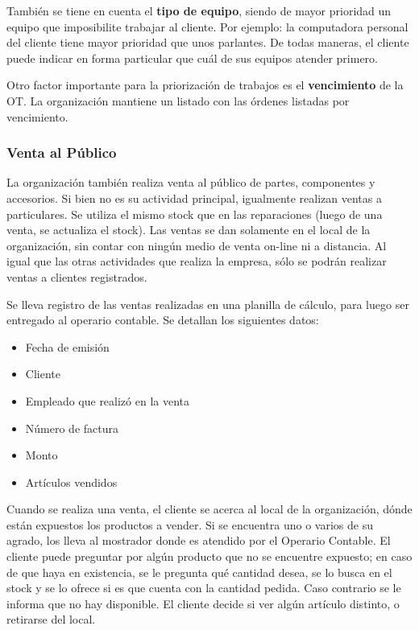 \documentclass[12pt]{extarticle}
\begin{document}
\begin{spacing}{1.2}
    También se tiene en cuenta el \textbf{tipo de equipo}, siendo de mayor prioridad un equipo que imposibilite trabajar al cliente. Por ejemplo: la computadora personal del cliente tiene mayor prioridad que unos parlantes.
    De todas maneras, el cliente puede indicar en forma particular que cuál de sus equipos atender primero.

    Otro factor importante para la priorización de trabajos es el \textbf{vencimiento} de la OT. La organización mantiene un listado con las órdenes listadas por vencimiento.

    \subsubsection{Venta al Público}
    La organización también realiza venta al público de partes, componentes y accesorios. Si bien no es su actividad principal, igualmente realizan ventas a particulares. Se utiliza el mismo stock que en las reparaciones (luego de una venta, se actualiza el stock). 
    Las ventas se dan solamente en el local de la organización, sin contar con ningún medio de venta on-line ni a distancia. Al igual que las otras actividades que realiza la empresa, sólo se podrán realizar ventas a clientes registrados.

    Se lleva registro de las ventas realizadas en una planilla de cálculo, para luego ser entregado al operario contable. Se detallan los siguientes datos:
    \begin{itemize}
        \item Fecha de emisión
        \item Cliente
        \item Empleado que realizó en la venta
        \item Número de factura
        \item Monto
        \item Artículos vendidos
    \end{itemize}

    Cuando se realiza una venta, el cliente se acerca al local de la organización, dónde están expuestos los productos a vender. Si se encuentra uno o varios de su agrado, los lleva al mostrador donde es atendido por el Operario Contable. 
    El cliente puede preguntar por algún producto que no se encuentre expuesto; en caso de que haya en existencia, se le pregunta qué cantidad desea, se lo busca en el stock y se lo ofrece si es que cuenta con la cantidad pedida. Caso contrario se le informa que no hay disponible. El cliente decide si ver algún artículo distinto, o retirarse del local.


\end{spacing}
\end{document}
